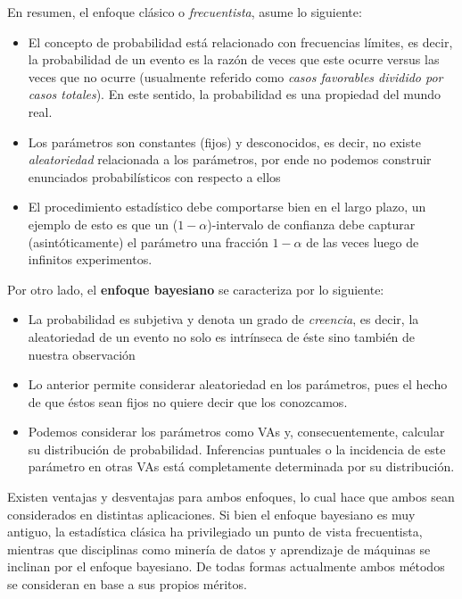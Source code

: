 En resumen, el enfoque clásico o \emph{frecuentista}, asume lo siguiente: 
\begin{itemize}
	\item El concepto de probabilidad está relacionado con frecuencias límites, es decir, la probabilidad de un evento es la razón de veces que este ocurre versus las veces que no ocurre (usualmente referido como \emph{casos favorables dividido por casos totales}). En este sentido, la probabilidad es una propiedad del mundo real. 
	\item Los parámetros son constantes (fijos) y desconocidos, es decir, no existe \emph{aleatoriedad} relacionada a los parámetros, por ende no podemos construir enunciados probabilísticos con respecto a ellos
	\item El procedimiento estadístico debe comportarse bien en el largo plazo, un ejemplo de esto es que un ($1-\alpha$)-intervalo de confianza debe capturar (asintóticamente) el parámetro una fracción $1-\alpha$ de las veces luego de infinitos experimentos. 
\end{itemize}

Por otro lado, el \textbf{enfoque bayesiano} se caracteriza por lo siguiente: 

\begin{itemize}
 	\item La probabilidad es subjetiva y denota un grado de \emph{creencia}, es decir, la aleatoriedad de un evento no solo es intrínseca de éste sino también de nuestra observación
 	\item Lo anterior permite considerar aleatoriedad en los parámetros, pues el hecho de que éstos sean fijos no quiere decir que los conozcamos. 
 	\item Podemos considerar los parámetros como VAs y, consecuentemente, calcular su distribución de probabilidad. Inferencias puntuales o la incidencia de este parámetro en otras VAs está completamente determinada por su distribución.
 \end{itemize}

 Existen ventajas y desventajas para ambos enfoques, lo cual hace que ambos sean considerados en distintas aplicaciones. Si bien el enfoque bayesiano es muy antiguo, la estadística clásica ha privilegiado un punto de vista frecuentista, mientras que disciplinas como minería de datos y aprendizaje de máquinas se inclinan por el enfoque bayesiano. De todas formas actualmente ambos métodos se consideran en base a sus propios méritos. 